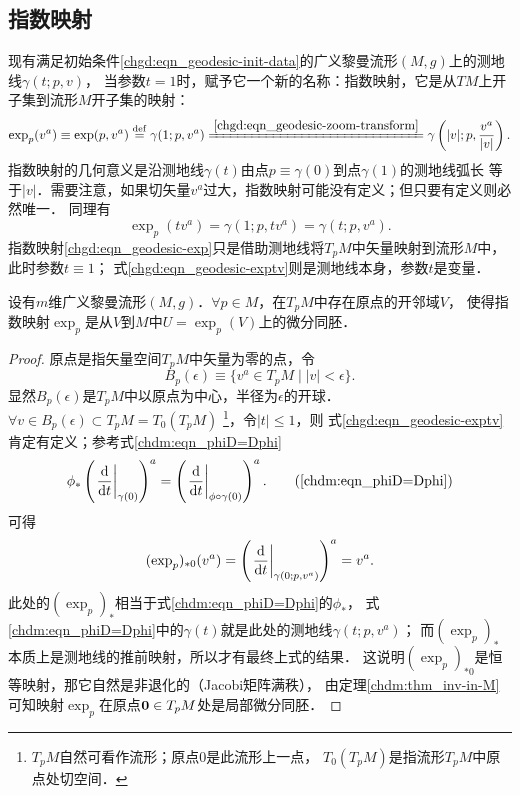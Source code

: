 \subsection{指数映射}\label{chgd:sec_exp}
现有满足初始条件\eqref{chgd:eqn_geodesic-init-data}的广义黎曼流形$(M,g)$上的测地线$\gamma(t;p,v)$，
当参数$t=1$时，赋予它一个新的名称：{\heiti 指数映射}，它是从$TM$上开子集到流形$M$开子集的映射：
\begin{equation}\label{chgd:eqn_geodesic-exp}
    \exp_p(v^a)\equiv\exp(p,v^a)\overset{\mathrm {def}}{=}\gamma(1;p,v^a)
    \xlongequal{\ref{chgd:eqn_geodesic-zoom-transform}}\gamma\left(|v|;p,\frac{v^a}{|v|}\right).
\end{equation}
指数映射的几何意义是沿测地线$\gamma(t)$由点$p\equiv \gamma(0)$到点$\gamma(1)$的测地线弧长
等于$|v|$．需要注意，如果切矢量$v^a$过大，指数映射可能没有定义；但只要有定义则必然唯一．
同理有
\begin{equation}\label{chgd:eqn_geodesic-exptv}
    \exp_p(t v^a)=\gamma(1;p,t v^a)=\gamma(t;p,v^a).
\end{equation}
指数映射\eqref{chgd:eqn_geodesic-exp}只是借助测地线将$T_pM$中矢量映射到流形$M$中，
此时参数$t\equiv 1$；
式\eqref{chgd:eqn_geodesic-exptv}则是测地线本身，参数$t$是变量．


\begin{theorem}\label{chgd:thm_exp-homeomorphism}
    设有$m$维广义黎曼流形$(M,g)$．$\forall p \in M$，在$T_p M$中存在原点的开邻域$V$，
    使得指数映射$\exp_{p}$是从$V$到$M$中$U=\exp_{p}(V)$上的微分同胚．
\end{theorem}
\begin{proof}
    原点是指矢量空间$T_p M$中矢量为零的点，令
    \begin{equation}
        B_p(\epsilon) \equiv \{v^a\in T_pM \mid |v|<\epsilon \} .
    \end{equation}
    显然$B_p(\epsilon)$是$T_pM$中以原点为中心，半径为$\epsilon$的开球．
    $\forall v\in B_p(\epsilon) \subset T_pM= T_0(T_pM) $
    {\footnote{$T_pM$自然可看作流形；原点$0$是此流形上一点，
            $T_0(T_p M)$是指流形$T_pM$中原点处切空间．}}，令$|t|\leqslant 1$，则
    式\eqref{chgd:eqn_geodesic-exptv}肯定有定义；参考式\eqref{chdm:eqn_phiD=Dphi}
    \begin{equation}
        \phi_{*}\left(\left.\frac{{\rm d}  }{{\rm d} t}\right|_{\gamma(0)}\right)^a
        = \left(\left.\frac{{\rm d}  }{{\rm d} t}\right|_{\phi\circ\gamma(0)}\right)^a.
        \tag{\ref{chdm:eqn_phiD=Dphi}}
    \end{equation}
    可得
    \begin{equation}
        (\exp_{p})_{*0} (v^a) = \left(\left.\frac{{\rm d}  }{{\rm d} t}
         \right|_{\gamma(0;p,v^a)}\right)^a = v^a .
    \end{equation}
    此处的$(\exp_{p})_{*}$相当于式\eqref{chdm:eqn_phiD=Dphi}的$\phi_{*}$，
    式\eqref{chdm:eqn_phiD=Dphi}中的$\gamma(t)$就是此处的测地线$\gamma(t;p,v^a)$；
    而$(\exp_{p})_{*}$本质上是测地线的推前映射，所以才有最终上式的结果．
    这说明$(\exp_{p})_{*0}$是恒等映射，那它自然是非退化的（Jacobi矩阵满秩），  %
    由定理\ref{chdm:thm_inv-in-M}可知映射$\exp_{p}$在原点${\bf 0}\in T_pM$处是局部微分同胚．
\end{proof}

